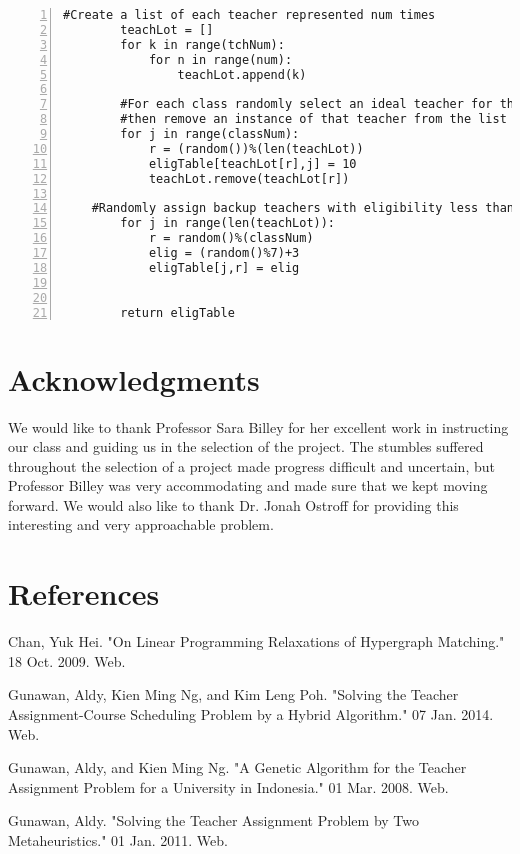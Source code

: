 \documentclass[11pt]{article}
\begin{document}
\begin{lstlisting}[numbers=left,numberstyle=\tiny,numbersep=0pt]
        #Create a list of each teacher represented num times
        teachLot = []
        for k in range(tchNum):
            for n in range(num):
                teachLot.append(k)
            
        #For each class randomly select an ideal teacher for that class
        #then remove an instance of that teacher from the list   
        for j in range(classNum):
            r = (random())%(len(teachLot))
            eligTable[teachLot[r],j] = 10
            teachLot.remove(teachLot[r])
        
   	#Randomly assign backup teachers with eligibility less than 10
        for j in range(len(teachLot)):
            r = random()%(classNum)
            elig = (random()%7)+3
            eligTable[j,r] = elig


        return eligTable
\end{lstlisting}


\section{Acknowledgments}
We would like to thank Professor Sara Billey for her excellent work in instructing our class and guiding us in the selection of the project. The stumbles suffered throughout the selection of a project made progress difficult and uncertain, but Professor Billey was very accommodating and made sure that we kept moving forward. We would also like to thank Dr. Jonah Ostroff for providing this interesting and very approachable problem. 

\section{References}
Chan, Yuk Hei. "On Linear Programming Relaxations of Hypergraph Matching." 18 Oct. 2009. Web.

Gunawan, Aldy, Kien Ming Ng, and Kim Leng Poh. "Solving the Teacher Assignment-Course Scheduling Problem by a Hybrid Algorithm." 07 Jan. 2014. Web.

Gunawan, Aldy, and Kien Ming Ng. "A Genetic Algorithm for the Teacher Assignment Problem for a University in Indonesia." 01 Mar. 2008. Web.

Gunawan, Aldy. "Solving the Teacher Assignment Problem by Two Metaheuristics." 01 Jan. 2011. Web.
\end{document}
